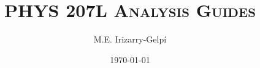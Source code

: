 \documentclass[letterpaper, 12pt]{report}
\begin{document}
\title{\textsc{PHYS 207L Analysis Guides}}
\author{M.E. Irizarry-Gelp\'{i}}
\date{\today}
\maketitle
\tableofcontents












\end{document}
